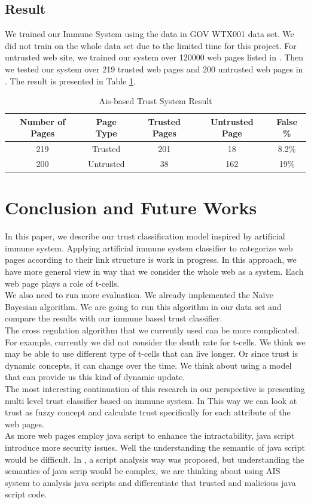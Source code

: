 \documentclass{llncs}
\begin{document}
\subsection{Result}
We trained our Immune System using the data in GOV WTX001 data set\cite{WTX}. We did not train on the whole data set due to the limited time for this project. For untrusted web site, we trained our system over 120000 web pages listed in \cite{WEBSPAM-UK2007}. Then we tested our system over 219 trusted web pages and 200 untrusted web pages in \cite{WEBSPAM-UK2007}. The result is presented in Table \ref{table:result}.
\begin{table}[t]
\renewcommand{\arraystretch}{1.3}
\caption{\small Ais-based Trust System Result}
\label{table:result}
\centering
{\scriptsize
\begin{tabular}{ccccc}
\hline
Number of Pages & Page Type & Trusted Pages & Untrusted Page & False \%\\
\hline
219 & Trusted & 201 & 18 & 8.2\%\\
200 & Untrusted & 38 & 162 & 19\%\\
\hline
\end{tabular}
}
\end{table}

\section{Conclusion and Future Works}
In this paper, we describe our trust classification model inspired by artificial immune system. Applying artificial immune system classifier to categorize web pages according to their link structure is work in progress. In this approach, we have more general view in way that we consider the whole web as a system. Each web page plays a role of t-cells. \\
We also need to run more evaluation. We already implemented the Naïve Bayesian algorithm. We are going to run this algorithm in our data set and compare the results with our immune based trust classifier.\\
The cross regulation algorithm that we currently used can be more complicated. For example, currently we did not consider the death rate for t-cells. We think we may be able to use different type of t-cells that can live longer. Or since trust is dynamic concepts, it can change over the time. We think about using a model that can provide us this kind of dynamic update. \\
The most interesting continuation of this research in our perspective is presenting multi level trust classifier based on immune system. In This way we can look at trust as fuzzy concept and calculate trust specifically for each attribute of the web pages.  \\
As more web pages employ java script to enhance the intractability, java script introduce more security issues. Well the understanding the semantic of java script would be difficult. In \cite{kruegel03:webanomaly}, a script analysis way was proposed, but understanding the semantics of java scrip would be complex, we are thinking about using AIS system to analysis java scripts and differentiate that trusted and malicious java script code.
\end{document}
